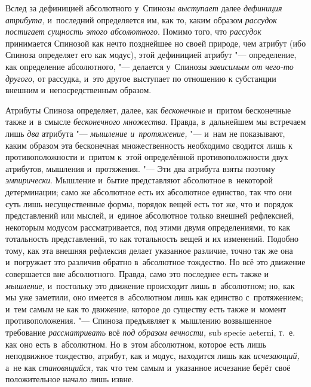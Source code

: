 Вслед за дефиницией абсолютного у~Спинозы
{\em выступает} далее
{\em дефиниция атрибута,} и~последний определяется им,
как то, каким образом {\em рассудок постигает сущность
этого
абсолютного}.
Помимо того, что {\em рассудок} принимается Спинозой
как нечто позднейшее но своей природе, чем атрибут (ибо Спиноза определяет
его как модус), этой дефиницией атрибут "--- определение, как определение
абсолютного, "--- делается у~Спинозы {\em зависимым от
чего-то другого,} от рассудка, и~это другое выступает по отношению к
субстанции внешним и~непосредственным образом.

Атрибуты Спиноза определяет, далее, как
{\em бесконечные} и~притом бесконечные также и~в смысле
{\em бесконечного множества}. Правда, в~дальнейшем мы
встречаем лишь {\em два} атрибута
"--- {\em мышление и~протяжение,} "--- и~нам не показывают,
каким образом эта бесконечная множественность необходимо сводится лишь к
противоположности и~притом к~этой определённой противоположности двух
атрибутов, мышления и~протяжения. "--- Эти два атрибута взяты поэтому
{\em эмпирически}. Мышление и~бытие представляют
абсолютное в~некоторой детерминации; само же абсолютное есть их абсолютное
единство, так что они суть лишь несущественные формы, порядок вещей есть
тот же, что и~порядок представлений или мыслей, и~единое абсолютное только
внешней рефлексией, некоторым модусом рассматривается, под этими двумя
определениями, то как тотальность представлений, то как тотальность вещей и
их изменений. Подобно тому, как эта внешняя рефлексия делает указанное
различие, точно так же она и~погружает это различив обратно в~абсолютное
тождество. Но всё это движение совершается вне абсолютного. Правда, само
это последнее есть также и {\em мышление,} и~постольку
это движение происходит лишь в~абсолютном; но, как мы уже заметили, оно
имеется в~абсолютном лишь как единство с~протяжением; и~тем самым не как то
движение, которое до существу есть также и~момент противоположения. "---
Спиноза предъявляет к~мышлению возвышенное требование
{\em рассматривать} всё {\em под
образом вечности,} sub specie aeterni, т.~е. как оно есть в~абсолютном. Но
в~этом абсолютном, которое есть лишь неподвижное тождество, атрибут, как и
модус, находится лишь как {\em исчезающий,} а~не как
{\em становящийся,} так что тем самым и~указанное
исчезание берёт своё положительное начало лишь извне.

